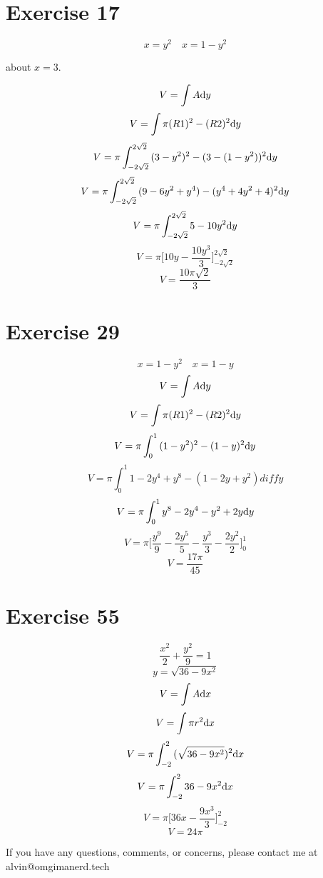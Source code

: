 \documentclass{math}
\begin{document}
\section*{Exercise 17}
\[ x = y^{2} \quad x = 1-y^{2} \]
\begin{center}
  about \( x = 3 \).
\end{center}
\[ V = \int{A\mathrm{d}{y}} \]
\[ V = \int{\pi(R1)^{2}-(R2)^{2}\mathrm{d}{y}} \]
\[ V = \pi\int_{-2\sqrt{2}}^{2\sqrt{2}}
       {(3-y^{2})^{2}-(3-(1-y^{2}))^{2}\mathrm{d}{y}} \]
\[ V = \pi\int_{-2\sqrt{2}}^{2\sqrt{2}}
       {(9-6y^{2}+y^{4})-(y^{4}+4y^{2}+4)^{2}\mathrm{d}{y}} \]
\[ V = \pi\int_{-2\sqrt{2}}^{2\sqrt{2}}{5-10y^{2}\mathrm{d}{y}} \]
\[ V = \pi\bigg[10y-\frac{10y^{3}}{3}\bigg]_{-2\sqrt{2}}^{2\sqrt{2}} \]
\[ V = \frac{10\pi\sqrt{2}}{3} \]

\section*{Exercise 29}
\[ x = 1-y^{2} \quad x=1-y \]
\[ V = \int{A\mathrm{d}{y}} \]
\[ V = \int{\pi(R1)^{2}-(R2)^{2}\mathrm{d}{y}} \]
\[ V = \pi\int_{0}^{1}{(1-y^{2})^{2}-(1-y)^{2}\mathrm{d}{y}} \]
\[ V = \pi\int_{0}^{1}{1-2y^{4}+y^{8}-(1-2y+y^{2})diff{y}} \]
\[ V = \pi\int_{0}^{1}{y^{8}-2y^{4}-y^{2}+2y\mathrm{d}{y}} \]
\[ V = \pi\bigg[\frac{y^{9}}{9}-\frac{2y^{5}}{5}-
       \frac{y^{3}}{3}-\frac{2y^{2}}{2}\bigg]_{0}^{1} \]
\[ V = \frac{17\pi}{45} \]

\section*{Exercise 55}
\[ \frac{x^{2}}{2}+\frac{y^{2}}{9} = 1 \]
\[ y = \sqrt{36-9x^{2}} \]
\[ V = \int{A\mathrm{d}{x}} \]
\[ V = \int{\pi r^{2}\mathrm{d}{x}} \]
\[ V = \pi\int_{-2}^{2}{(\sqrt{36-9x^{2}})^{2}\mathrm{d}{x}} \]
\[ V = \pi\int_{-2}^{2}{36-9x^{2}\mathrm{d}{x}} \]
\[ V = \pi\bigg[36x-\frac{9x^{3}}{3}\bigg]_{-2}^{2} \]
\[ V = 24\pi \]

\begin{center}
  If you have any questions, comments, or concerns, please contact me at
  alvin@omgimanerd.tech
\end{center}
\end{document}
